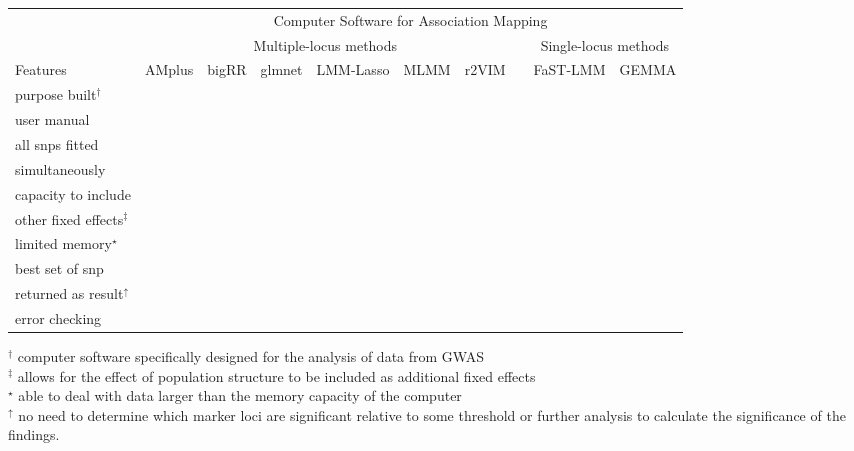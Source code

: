 \documentclass[10pt]{article}
\newcommand{\cmark}{\ding{51}}%
\newcommand{\xmark}{\ding{55}}%
\begin{document}
\begin{table}
\begin{tabular}{lccccccccc}
                                &  \multicolumn{9}{c}{Computer Software for Association Mapping} \\ \cline{2-10}
                                 & \multicolumn{6}{c}{Multiple-locus methods}  & & \multicolumn{2}{c}{Single-locus methods} \\  \cline{2-7}   \cline{9-10}
 Features                 & AMplus  & bigRR & glmnet & LMM-Lasso & MLMM & r2VIM     & & FaST-LMM & GEMMA \\  \hline
purpose built$^\dagger$    &   \cmark     &    \cmark      &  \xmark   &  \cmark  &  \cmark  &  \cmark && \cmark & \cmark           \\ [0.2cm]
 user  manual           & \cmark &   \xmark   & \cmark   & \xmark     &   \cmark     & \xmark          && \cmark    &    \cmark    \\  [0.2cm]
all snps fitted  &    \cmark     &    \cmark        &   \cmark          &      \cmark             &  \xmark          &  \xmark              &&   \xmark   &  \xmark     \\  
simultaneously      &         &            &             &                   &            &                &&      &      \\  [0.2cm]
capacity to include          &   \cmark   &      \cmark      &     \cmark    &  \xmark                 &      \cmark      &      \cmark          &&      \cmark & \cmark     \\  
other fixed effects$^\ddagger$                  &         &              &          &                    &            &                &&      &      \\  [0.2cm]
limited  memory$^\star$                   &   \cmark    &      \xmark      & \xmark          &  \xmark    &  \xmark    &   \xmark     && \cmark      & \xmark    \\  [0.2cm]
best set of snp           &    \cmark     &  \xmark    &  \xmark         &    \xmark               &     \cmark       &  \xmark              &&  \xmark   & \xmark      \\  
returned as result$^\uparrow$               &                           &        & & & & & & & \\  [0.2cm]
error checking           &  \cmark      &     \xmark        &      \xmark     &           \xmark        &      \xmark       &         \xmark       && \cmark  & \xmark \\ \hline

\end{tabular}
{$^\dagger$ \scriptsize{computer software specifically designed for the analysis of data from GWAS}}\\
{$^\ddagger$ \scriptsize{ allows  for the effect of population structure to be included as additional fixed effects}}\\
{\small $^\star$ \scriptsize{able to deal with data larger than the memory capacity of the computer}} \\
{\small $^\uparrow$ \scriptsize{no need to determine which 
marker loci are significant relative to some threshold or further analysis to calculate the significance of the findings. }}
\end{table}
\end{document}
